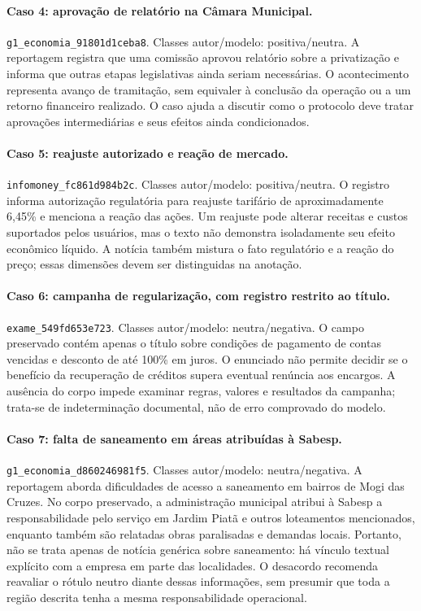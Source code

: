 \paragraph{Caso 4: aprovação de relatório na Câmara Municipal.}
\texttt{g1\_\allowbreak{}economia\_\allowbreak{}91801d1ceba8}. Classes autor/modelo: positiva/neutra. A reportagem registra que uma comissão aprovou relatório sobre a privatização e informa que outras etapas legislativas ainda seriam necessárias. O acontecimento representa avanço de tramitação, sem equivaler à conclusão da operação ou a um retorno financeiro realizado. O caso ajuda a discutir como o protocolo deve tratar aprovações intermediárias e seus efeitos ainda condicionados.

\paragraph{Caso 5: reajuste autorizado e reação de mercado.}
\texttt{infomoney\_\allowbreak{}fc861d984b2c}. Classes autor/modelo: positiva/neutra. O registro informa autorização regulatória para reajuste tarifário de aproximadamente 6,45\% e menciona a reação das ações. Um reajuste pode alterar receitas e custos suportados pelos usuários, mas o texto não demonstra isoladamente seu efeito econômico líquido. A notícia também mistura o fato regulatório e a reação do preço; essas dimensões devem ser distinguidas na anotação.

\paragraph{Caso 6: campanha de regularização, com registro restrito ao título.}
\texttt{exame\_\allowbreak{}549fd653e723}. Classes autor/modelo: neutra/negativa. O campo preservado contém apenas o título sobre condições de pagamento de contas vencidas e desconto de até 100\% em juros. O enunciado não permite decidir se o benefício da recuperação de créditos supera eventual renúncia aos encargos. A ausência do corpo impede examinar regras, valores e resultados da campanha; trata-se de indeterminação documental, não de erro comprovado do modelo.

\paragraph{Caso 7: falta de saneamento em áreas atribuídas à Sabesp.}
\texttt{g1\_\allowbreak{}economia\_\allowbreak{}d860246981f5}. Classes autor/modelo: neutra/negativa. A reportagem aborda dificuldades de acesso a saneamento em bairros de Mogi das Cruzes. No corpo preservado, a administração municipal atribui à Sabesp a responsabilidade pelo serviço em Jardim Piatã e outros loteamentos mencionados, enquanto também são relatadas obras paralisadas e demandas locais. Portanto, não se trata apenas de notícia genérica sobre saneamento: há vínculo textual explícito com a empresa em parte das localidades. O desacordo recomenda reavaliar o rótulo neutro diante dessas informações, sem presumir que toda a região descrita tenha a mesma responsabilidade operacional.


